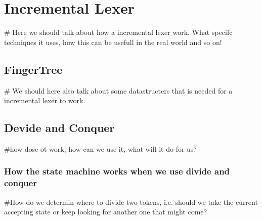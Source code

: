 \chapter{Incremental Lexer}
\# Here we should talk about how a incremental lexer work. What specifc
techniques it uses, how this can be usefull in the real world and so on!

\section{FingerTree}
\# We should here also talk about some datastructers that is needed for a
incremental lexer to work. 

\section{Devide and Conquer}
\#how dose ot work, how can we use it, what will it do for us?

\subsection{How the state machine works when we use divide and conquer} %
\#How do we determin where to divide two tokens, i.e. should we take the current
  accepting state or keep looking for another one that might come?

